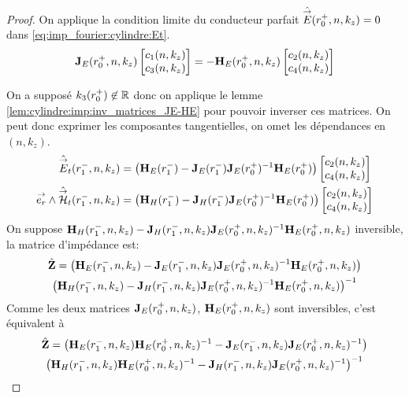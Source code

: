     \begin{proof}
      On applique la condition limite du conducteur parfait \(\hat {{\overset{\rightarrow}{E}}}(r_0^+,n,k_z) = 0\) dans \eqref{eq:imp_fourier:cylindre:Et}.
      \begin{equation}
        \mathbf{J}_{E}(r_0^+,n,k_z)
        \begin{bmatrix}
          c_1(n,k_z) \\
          c_3(n,k_z)
        \end{bmatrix}
        =-\mathbf{H}_{E}(r_0^+,n,k_z)
        \begin{bmatrix}
          c_2(n,k_z) \\
          c_4(n,k_z)
        \end{bmatrix}
      \end{equation}

      On a supposé \(k_3(r_0^+)\not \in \mathbb R \) donc on applique le lemme \ref{lem:cylindre:imp:inv_matrices_JE-HE} pour pouvoir inverser ces matrices.
      On peut donc exprimer les composantes tangentielles, on omet les dépendances en \((n,k_z)\).
      \begin{align}
        \hat {{\overset{\rightarrow}{E}}}_t(r_1^-,n,k_z) &=
        \left(\mathbf{H}_{E}(r_1^-) - \mathbf{J}_{E}(r_1^-)\mathbf{J}_{E}(r_0^+)^{-1}\mathbf{H}_{E}(r_0^+)\right)
        \begin{bmatrix}
          c_2(n,k_z) \\
          c_4(n,k_z)
        \end{bmatrix}
        \\
        {\overset{\rightarrow}{e_r}}\wedge \hat {{\overset{\rightarrow}{\mathcal{H}}}}_t(r_1^-,n,k_z) &=
        \left(\mathbf{H}_{H}(r_1^-) - \mathbf{J}_{H}(r_1^-)\mathbf{J}_{E}(r_0^+)^{-1}\mathbf{H}_{E}(r_0^+) \right)
        \begin{bmatrix}
          c_2(n,k_z) \\
          c_4(n,k_z)
        \end{bmatrix}
      \end{align}
      On suppose \(\mathbf{H}_{H}(r_1^-,n,k_z) - \mathbf{J}_{H}(r_1^-,n,k_z)\mathbf{J}_{E}(r_0^+,n,k_z)^{-1}\mathbf{H}_{E}(r_0^+,n,k_z)\) inversible, la matrice d'impédance est:
      \begin{multline}
        \hat {\mathbf{Z}} =
        \left(\mathbf{H}_{E}(r_1^-,n,k_z) - \mathbf{J}_{E}(r_1^-,n,k_z)\mathbf{J}_{E}(r_0^+,n,k_z)^{-1}\mathbf{H}_{E}(r_0^+,n,k_z)\right)
        \\
        \left(\mathbf{H}_{H}(r_1^-,n,k_z) - \mathbf{J}_{H}(r_1^-,n,k_z)\mathbf{J}_{E}(r_0^+,n,k_z)^{-1}\mathbf{H}_{E}(r_0^+,n,k_z)\right)^{-1}
      \end{multline}
      Comme les deux matrices \(\mathbf{J}_E(r_0^+,n,k_z)\), \(\mathbf{H}_E(r_0^+,n,k_z)\) sont inversibles, c'est équivalent à
      \begin{multline}
        \hat {\mathbf{Z}} =
        \left(\mathbf{H}_{E}(r_1^-,n,k_z)\mathbf{H}_{E}(r_0^+,n,k_z)^{-1} - \mathbf{J}_{E}(r_1^-,n,k_z)\mathbf{J}_{E}(r_0^+,n,k_z)^{-1}\right)
        \\
        \left(\mathbf{H}_{H}(r_1^-,n,k_z)\mathbf{H}_{E}(r_0^+,n,k_z)^{-1} - \mathbf{J}_{H}(r_1^-,n,k_z)\mathbf{J}_{E}(r_0^+,n,k_z)^{-1}\right)^{-1}
      \end{multline}


\end{proof}
